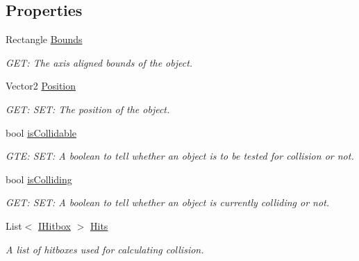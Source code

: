 \subsection*{Properties}
\begin{DoxyCompactItemize}
\item 
Rectangle \hyperlink{a00426_aa4cbc57adf743bacff53f85bb4a2fcf3}{Bounds}
\begin{DoxyCompactList}\small\item\em G\+ET\+: The axis aligned bounds of the object. \end{DoxyCompactList}\item 
Vector2 \hyperlink{a00426_a4e17a9b41927fab6d2973c4feb0a993a}{Position}
\begin{DoxyCompactList}\small\item\em G\+ET\+: S\+ET\+: The position of the object. \end{DoxyCompactList}\item 
bool \hyperlink{a00426_a833b30a82fe2f6ae78ea7b84fe742b35}{is\+Collidable}
\begin{DoxyCompactList}\small\item\em G\+TE\+: S\+ET\+: A boolean to tell whether an object is to be tested for collision or not. \end{DoxyCompactList}\item 
bool \hyperlink{a00426_a04dfebf647bfd0967be3dd4ba76706e5}{is\+Colliding}
\begin{DoxyCompactList}\small\item\em G\+ET\+: S\+ET\+: A boolean to tell whether an object is currently colliding or not. \end{DoxyCompactList}\item 
List$<$ \hyperlink{a00434}{I\+Hitbox} $>$ \hyperlink{a00426_a0a723609d175ef0f7eca7002572a76bb}{Hits}
\begin{DoxyCompactList}\small\item\em A list of hitboxes used for calculating collision. \end{DoxyCompactList}\end{DoxyCompactItemize}


